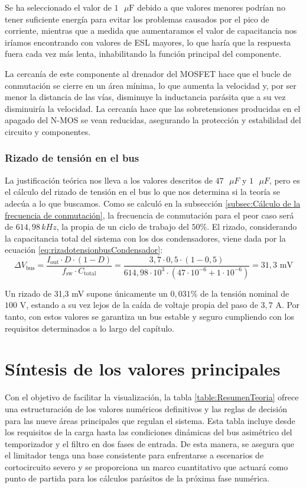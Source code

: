 \documentclass[12pt]{report} %
\begin{document}
Se ha seleccionado el valor de $1\text{ }\mu\text{F}$ debido a que valores menores podrían no tener suficiente energía para evitar los problemas causados por el pico de corriente, mientras que a medida que aumentaramos el valor de capacitancia nos iríamos encontrando con valores de ESL mayores, lo que haría que la respuesta fuera cada vez más lenta, inhabilitando la función principal del componente.

La cercanía de este componente al drenador del MOSFET hace que el bucle de conmutación se cierre en un área mínima, lo que aumenta la velocidad y, por ser menor la distancia de las vías, disminuye la inductancia parásita que a su vez disminuiría la velocidad. La cercanía hace que las sobretensiones producidas en el apagado del N-MOS se vean reducidas, asegurando la protección y estabilidad del circuito y componentes. 

\subsubsection{Rizado de tensión en el bus}
La justificación teórica nos lleva a los valores descritos de $47\text{ }\mu F$ y $1\text{ }\mu F$, pero es el cálculo del rizado de tensión en el bus lo que nos determina si la teoría se adecúa a lo que buscamos. Como se calculó en la subsección \ref{subsec:Cálculo de la frecuencia de conmutación}, la frecuencia de conmutación para el peor caso será de $614{,}98\,kHz$, la propia de un ciclo de trabajo del $50\%$. El rizado, considerando la capacitancia total del sistema con los dos condensadores, viene dada por la ecuación \ref{eq:rizadotensionbusCondensador}:
\begin{equation}
    \label{eq:rizadotensionbusCondensador}
    \Delta V_\text{bus} = \frac{I_\text{out} \cdot D \cdot (1 - D)}{f_\text{sw} \cdot C_\text{total}} = \frac{3{,}7 \cdot 0{,}5 \cdot (1-0{,}5)}{614{,}98 \cdot 10^{3}\cdot (47\cdot 10^{-6} + 1 \cdot 10^{-6})} = 31{,}3 \text{ mV}
\end{equation}

Un rizado de 31,3 mV supone únicamente un $0{,}031\%$ de la tensión nominal de $100\text{ V}$, estando a su vez lejos de la caída de voltaje propia del paso de $3{,}7\text{ A}$. Por tanto, con estos valores se garantiza un bus estable y seguro cumpliendo con los requisitos determinados a lo largo del capítulo. 
\section{Síntesis de los valores principales}
Con el objetivo de facilitar la visualización, la tabla \ref{table:ResumenTeoria} ofrece una estructuración de los valores numéricos definitivos y las reglas de decisión para las nueve áreas principales que regulan el sistema. Esta tabla incluye desde los requisitos de la carga hasta las condiciones dinámicas del bus asimétrico del temporizador y el filtro en dos fases de entrada. De esta manera, se asegura que el limitador tenga una base consistente para enfrentarse a escenarios de cortocircuito severo y se proporciona un marco cuantitativo que actuará como punto de partida para los cálculos parásitos de la próxima fase numérica.
\end{document}
